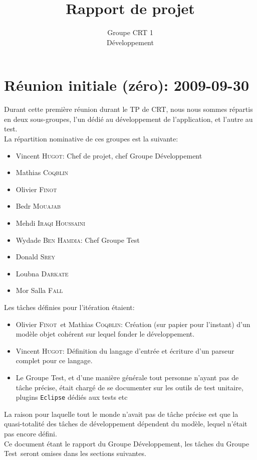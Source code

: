 \documentclass[a4paper,12pt]{article}
\author{Groupe CRT 1\\Développement}
\title{Rapport de projet}
\def\familyname{\textsc}
\def\firstname#1{#1}
\def\groupmember#1#2{\firstname{#1} \familyname{#2}}
\def\mwyd{\groupmember{Wydade}{Ben Hamdia}}
\def\mmat{\groupmember{Mathias}{Coqblin}}
\def\mlou{\groupmember{Loubna}{Darkate}}
\def\mmor{\groupmember{Mor Salla}{Fall}}
\def\moli{\groupmember{Olivier}{Finot}}
\def\mvin{\groupmember{Vincent}{Hugot}}
\def\mmed{\groupmember{Mehdi}{Iraqi Houssaini}}
\def\mbed{\groupmember{Bedr}{Mouajab}}
\def\mdon{\groupmember{Donald}{Srey}}
\def\grpd{Groupe Développement}
\def\grpt{Groupe Test}
\begin{document}
 
\maketitle


\tableofcontents


\section{Réunion initiale (zéro): 2009-09-30}

Durant cette première réunion durant le TP de CRT, nous 
nous sommes répartis en deux sous-groupes, l'un dédié au développement
de l'application, et l'autre au test.\mk\\
%
La répartition nominative de ces groupes est la suivante:
\begin{itemize}
\item \mvin : Chef de projet, chef \grpd
\item \mmat
\item \moli
\item \mbed
\item \mmed
\end{itemize}


\begin{itemize}
\item \mwyd : Chef \grpt
\item \mdon
\item \mlou
\item \mmor
\end{itemize}


\noi Les tâches définies pour l'itération étaient:

\begin{itemize}
 \item \moli\ et \mmat: Création (sur papier pour l'instant) d'un modèle objet cohérent sur lequel fonder le développement.
\item  \mvin : Définition du langage d'entrée et écriture d'un parseur complet pour ce langage.
\item Le \grpt, et d'une manière générale tout personne n'ayant pas de tâche précise,
était chargé de se documenter sur les outils de test
unitaire, plugins \texttt{Eclipse} dédiés aux tests etc
\end{itemize}
La raison pour laquelle tout le monde n'avait pas de tâche précise est que la 
quasi-totalité des tâches de développement dépendent du modèle, lequel n'était 
pas encore défini.\mk\\
%
Ce document étant le rapport du \grpd, les tâches du \grpt\ seront
omises dans les sections suivantes.
\end{document}

